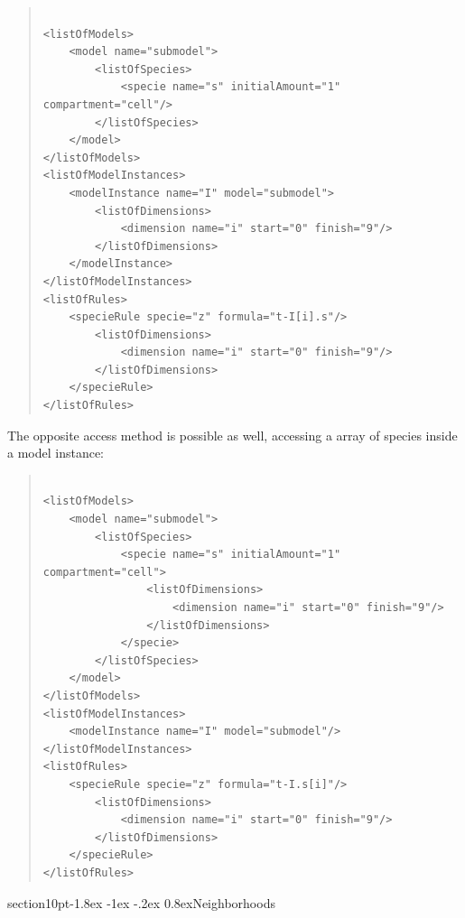 \documentclass[10pt]{article}
\makeatletter
\renewcommand{\section}{\@startsection%
  {section}{1}{0pt}{-1.8ex \@plus -1ex \@minus -.2ex}%
  {0.8ex}{\normalfont\Large\bfseries\sffamily}}
\newcommand{\tightspacing}{\renewcommand{\baselinestretch}{0.85}}
\newcommand{\regularspacing}{\renewcommand{\baselinestretch}{1.0}}
\makeatother
\begin{document}
\begin{quote}
  \begin{small}
    \tightspacing

\begin{verbatim}

<listOfModels>
    <model name="submodel">
        <listOfSpecies>
            <specie name="s" initialAmount="1" compartment="cell"/>
        </listOfSpecies>
    </model>
</listOfModels>
<listOfModelInstances>
    <modelInstance name="I" model="submodel">
        <listOfDimensions>
            <dimension name="i" start="0" finish="9"/>
        </listOfDimensions>
    </modelInstance>
</listOfModelInstances>
<listOfRules>
    <specieRule specie="z" formula="t-I[i].s"/>
        <listOfDimensions>
            <dimension name="i" start="0" finish="9"/>
        </listOfDimensions>
    </specieRule>
</listOfRules>

\end{verbatim}

    \regularspacing
  \end{small}
\end{quote}

The opposite access method is possible as well, accessing a array of species inside a model instance:

\begin{quote}
  \begin{small}
    \tightspacing

\begin{verbatim}

<listOfModels>
    <model name="submodel">
        <listOfSpecies>
            <specie name="s" initialAmount="1" compartment="cell">
                <listOfDimensions>
                    <dimension name="i" start="0" finish="9"/>
                </listOfDimensions>
            </specie>
        </listOfSpecies>
    </model>
</listOfModels>
<listOfModelInstances>
    <modelInstance name="I" model="submodel"/>
</listOfModelInstances>
<listOfRules>
    <specieRule specie="z" formula="t-I.s[i]"/>
        <listOfDimensions>
            <dimension name="i" start="0" finish="9"/>
        </listOfDimensions>
    </specieRule>
</listOfRules>

\end{verbatim}

    \regularspacing
  \end{small}
\end{quote}

\section{Neighborhoods}
\end{document}
